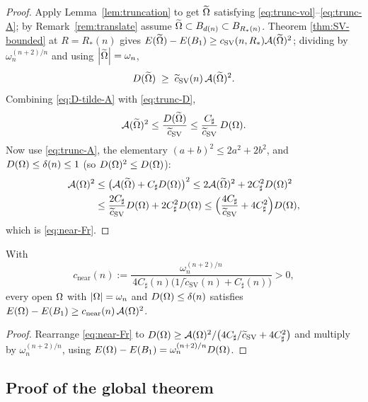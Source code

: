 \begin{proof}
Apply Lemma~\ref{lem:truncation} to get $\widetilde{\Omega}$ satisfying
\eqref{eq:trunc-vol}--\eqref{eq:trunc-A}; by Remark~\ref{rem:translate}
assume $\widetilde{\Omega}\subset B_{d(n)}\subset B_{R_*(n)}$. Theorem
\ref{thm:SV-bounded} at $R=R_*(n)$ gives
$E(\widetilde{\Omega})-E(B_1)\ge c_{\mathrm{SV}}(n,R_*)\mathcal{A}(\widetilde{\Omega})^2$; dividing by
$\omega_n^{(n+2)/n}$ and using $\left|\widetilde{\Omega}\right|=\omega_n$,
\begin{equation}\label{eq:D-tilde-A}
   D(\widetilde{\Omega})\;\ge\;\widetilde c_{\mathrm{SV}}(n)\,\mathcal{A}(\widetilde{\Omega})^2 .
\end{equation}
Combining \eqref{eq:D-tilde-A} with \eqref{eq:trunc-D},
\[
   \mathcal{A}(\widetilde{\Omega})^2\le\frac{D(\widetilde{\Omega})}{\widetilde c_{\mathrm{SV}}}
   \le\frac{C_\sharp}{\widetilde c_{\mathrm{SV}}}\,D(\Omega).
\]
Now use \eqref{eq:trunc-A}, the elementary
$(a+b)^2\le2a^2+2b^2$, and $D(\Omega)\le\delta(n)\le1$ (so
$D(\Omega)^2\le D(\Omega)$):
\begin{align*}
   \mathcal{A}(\Omega)^2
   &\le\bigl(\mathcal{A}(\widetilde{\Omega})+C_\sharp D(\Omega)\bigr)^2
    \le2\mathcal{A}(\widetilde{\Omega})^2+2C_\sharp^2D(\Omega)^2\\
   &\le\frac{2C_\sharp}{\widetilde c_{\mathrm{SV}}}D(\Omega)+2C_\sharp^2D(\Omega)
    \le\Bigl(\frac{4C_\sharp}{\widetilde c_{\mathrm{SV}}}+4C_\sharp^2\Bigr)D(\Omega),
\end{align*}
which is \eqref{eq:near-Fr}.
\end{proof}

\begin{corollary}\label{cor:near}
With
\begin{equation}\label{eq:cnear}
   c_{\mathrm{near}}(n):=
   \frac{\omega_n^{(n+2)/n}}
        {\,4C_\sharp(n)\bigl(1/\widetilde c_{\mathrm{SV}}(n)+C_\sharp(n)\bigr)}>0,
\end{equation}
every open $\Omega$ with $\left|\Omega\right|=\omega_n$ and $D(\Omega)\le\delta(n)$
satisfies $E(\Omega)-E(B_1)\ge c_{\mathrm{near}}(n)\,\mathcal{A}(\Omega)^2$.
\end{corollary}

\begin{proof}
Rearrange \eqref{eq:near-Fr} to
$D(\Omega)\ge\mathcal{A}(\Omega)^2/\bigl(4C_\sharp/\widetilde c_{\mathrm{SV}}
+4C_\sharp^2\bigr)$ and multiply by $\omega_n^{(n+2)/n}$, using
$E(\Omega)-E(B_1)=\omega_n^{(n+2)/n}D(\Omega)$.
\end{proof}

\subsection{Proof of the global theorem}\label{ssec:global-proof}

